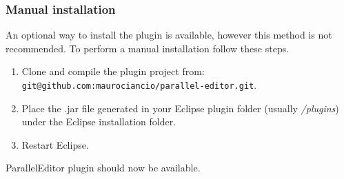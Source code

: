 \subsubsection{Manual installation}

An optional way to install the plugin is available, however this method is not recommended. To perform a manual installation follow these steps.

\begin{enumerate}
\item
  Clone and compile the plugin project from: \\
  \texttt{git@github.com:maurociancio/parallel-editor.git}.
\item
  Place the .jar file generated in your Eclipse plugin folder
  (usually \emph{/plugins}) under the Eclipse installation folder.
\item
  Restart Eclipse.
\end{enumerate}
ParallelEditor plugin should now be available.

